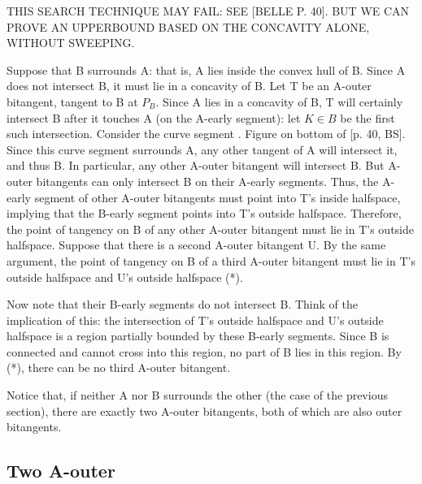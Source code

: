 \documentclass[12pt]{article}
\begin{document}
THIS SEARCH TECHNIQUE MAY FAIL: SEE [BELLE P. 40].
BUT WE CAN PROVE AN UPPERBOUND BASED ON THE CONCAVITY ALONE, WITHOUT SWEEPING.

Suppose that B surrounds A: that is, A lies inside the convex hull of B.
Since A does not intersect B, it must lie in a concavity of B.
Let T be an A-outer bitangent, tangent to B at $P_B$.
Since A lies in a concavity of B, T will certainly intersect B after it touches A
(on the A-early segment): let $K \in B$ be the first such intersection.
Consider the curve segment .
Figure on bottom of [p. 40, BS].
Since this curve segment surrounds A, any other tangent of A will intersect it, and thus B.
In particular, any other A-outer bitangent will intersect B.
But A-outer bitangents can only intersect B on their A-early segments.
Thus, the A-early segment of other A-outer bitangents must point into T's inside halfspace,
implying that the B-early segment points into T's outside halfspace.
Therefore, the point of tangency on B of any other A-outer bitangent must lie
in T's outside halfspace.
Suppose that there is a second A-outer bitangent U.
By the same argument, the point of tangency on B of a third A-outer bitangent
must lie in T's outside halfspace and U's outside halfspace (*).

Now note that their B-early segments do not intersect B.
Think of the implication of this: the intersection of T's outside halfspace 
and U's outside halfspace is a region partially bounded by these B-early segments.
Since B is connected and cannot cross into this region, no part of B lies in this region.
By (*), there can be no third A-outer bitangent.
\QED

Notice that, if neither A nor B surrounds the other (the case of the previous section),
there are exactly two A-outer bitangents, both of which are also outer bitangents.

\clearpage

\subsection{Two A-outer}
\end{document}
